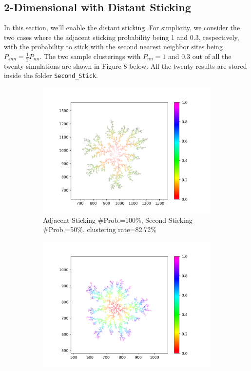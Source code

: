 \documentclass[10pt]{article}
\begin{document}
\subsection{2-Dimensional with Distant Sticking}

In this section, we'll enable the distant sticking. For simplicity, we consider the two cases where the adjacent sticking probability being 1 and 0.3, respectively, with the probability to stick with the second nearest neighbor sites being $P_{snn} = \frac{1}{2} P_{nn}$. The two sample clusterings with $P_{nn} = 1$ and $0.3$ out of all the twenty simulations are shown in Figure 8 below. All the twenty results are stored inside the folder \texttt{Second\_Stick}.

\begin{figure}[h]
	\centering
	\begin{subfigure}[b]{0.3\textwidth}
		\centering
		\includegraphics[width=\textwidth]{Figure_12}
		\caption{Adjacent Sticking \#Prob.=100\%, Second Sticking \#Prob.=50\%, clustering rate=82.72\%}
	\end{subfigure}
	\begin{subfigure}[b]{0.3\textwidth}
		\centering
		\includegraphics[width=\textwidth]{Figure_13}

\end{subfigure}
\end{figure}
\end{document}
